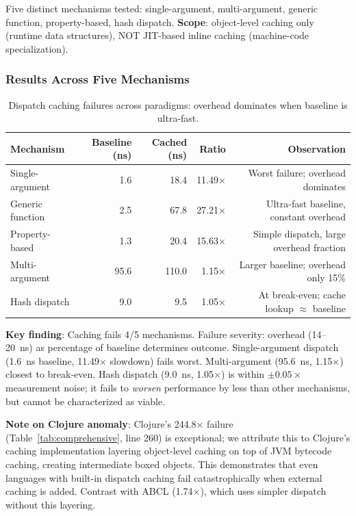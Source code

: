 \documentclass[sigplan,final,acmsmall,review,screen]{acmart}
\begin{document}
Five distinct mechanisms tested: single-argument, multi-argument, generic function, property-based, hash dispatch. \textbf{Scope}: object-level caching only (runtime data structures), NOT JIT-based inline caching (machine-code specialization).

\subsubsection{Results Across Five Mechanisms}

\begin{table}[h!]
\centering
\small
\caption{Dispatch caching failures across paradigms: overhead dominates when baseline is ultra-fast.}
\label{tab:dispatch-mechanisms}
\begin{tabular}{@{}lrrrr@{}}
\toprule
\textbf{Mechanism} & \textbf{Baseline (ns)} & \textbf{Cached (ns)} & \textbf{Ratio} & \textbf{Observation} \\
\midrule
Single-argument & 1.6 & 18.4 & 11.49× & Worst failure; overhead dominates \\
Generic function & 2.5 & 67.8 & 27.21× & Ultra-fast baseline, constant overhead \\
Property-based & 1.3 & 20.4 & 15.63× & Simple dispatch, large overhead fraction \\
Multi-argument & 95.6 & 110.0 & 1.15× & Larger baseline; overhead only 15\% \\
Hash dispatch & 9.0 & 9.5 & 1.05× & At break-even; cache lookup $\approx$ baseline \\
\midrule
\end{tabular}
\end{table}

\textbf{Key finding}: Caching fails 4/5 mechanisms. Failure severity: overhead (14--20~ns) as percentage of baseline determines outcome. Single-argument dispatch (1.6~ns baseline, 11.49× slowdown) fails worst. Multi-argument (95.6~ns, 1.15×) closest to break-even. Hash dispatch (9.0~ns, 1.05$\times$) is within ${\pm}0.05{\times}$ measurement noise; it fails to \emph{worsen} performance by less than other mechanisms, but cannot be characterized as viable.

\textbf{Note on Clojure anomaly}: Clojure's 244.8× failure (Table~\ref{tab:comprehensive}, line 260) is exceptional; we attribute this to Clojure's caching implementation layering object-level caching on top of JVM bytecode caching, creating intermediate boxed objects. This demonstrates that even languages with built-in dispatch caching fail catastrophically when external caching is added. Contrast with ABCL (1.74×), which uses simpler dispatch without this layering.
\end{document}
